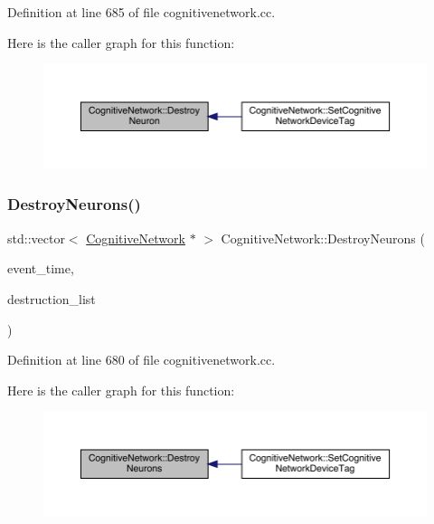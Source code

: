 Definition at line 685 of file cognitivenetwork.\+cc.

Here is the caller graph for this function\+:
\nopagebreak
\begin{figure}[H]
\begin{center}
\leavevmode
\includegraphics[width=350pt]{class_cognitive_network_ab3318f517da206ad4286b6cc22acf520_icgraph}
\end{center}
\end{figure}
\mbox{\label{class_cognitive_network_af2f706043a0c227b93877e29b056f3c9}} 
\subsubsection{\texorpdfstring{Destroy\+Neurons()}{DestroyNeurons()}}
{\footnotesize\ttfamily std\+::vector$<$ \hyperlink{class_cognitive_network}{Cognitive\+Network} $\ast$ $>$ Cognitive\+Network\+::\+Destroy\+Neurons (\begin{DoxyParamCaption}\item[{std\+::chrono\+::time\+\_\+point$<$ \hyperlink{universe_8h_a0ef8d951d1ca5ab3cfaf7ab4c7a6fd80}{Clock} $>$}]{event\+\_\+time,  }\item[{std\+::vector$<$ \hyperlink{class_cognitive_network}{Cognitive\+Network} $\ast$$>$}]{destruction\+\_\+list }\end{DoxyParamCaption})}



Definition at line 680 of file cognitivenetwork.\+cc.

Here is the caller graph for this function\+:
\nopagebreak
\begin{figure}[H]
\begin{center}
\leavevmode
\includegraphics[width=350pt]{class_cognitive_network_af2f706043a0c227b93877e29b056f3c9_icgraph}
\end{center}
\end{figure}
\mbox{\label{class_cognitive_network_a0f943978df49ef879c43c15c81682a8a}} 
